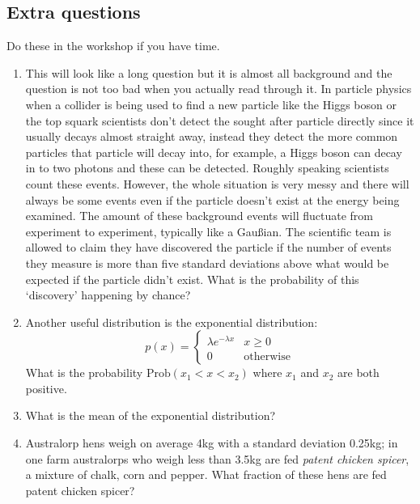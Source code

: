 \documentclass[11pt,a4paper]{scrartcl}
\begin{document}
\subsection*{Extra questions}

Do these in the workshop if you have time.

\begin{enumerate}

  
\item This will look like a long question but it is almost all
  background and the question is not too bad when you actually read
  through it. In particle physics when a collider is being used to
  find a new particle like the Higgs boson or the top squark
  scientists don't detect the sought after particle directly since it
  usually decays almost straight away, instead they detect the more
  common particles that particle will decay into, for example, a Higgs
  boson can decay in to two photons and these can be detected. Roughly
  speaking scientists count these events. However, the whole situation
  is very messy and there will always be some events even if the
  particle doesn't exist at the energy being examined. The amount of
  these background events will fluctuate from experiment to
  experiment, typically like a Gau\ss{}ian. The scientific team is
  allowed to claim they have discovered the particle if the number of
  events they measure is more than five standard deviations above
  what would be expected if the particle didn't exist. What is the
  probability of this \lq{}discovery\rq{} happening by chance?


\item Another useful distribution is the exponential distribution:
$$
p(x)=\left\{\begin{array}{cc}\lambda e^{-\lambda x}& x\ge 0\\ 0&\mbox{otherwise}\end{array}\right.
$$
What is the probability $\mbox{Prob}(x_1 < x <x_2)$ where $x_1$ and $x_2$ are both positive.

\item What is the mean of the exponential distribution?

  
\item Australorp hens weigh on average 4kg with a standard deviation
  0.25kg; in one farm australorps who weigh less than 3.5kg are fed
  \textsl{patent chicken spicer}, a mixture of chalk, corn and
  pepper. What fraction of these hens are fed patent chicken spicer?
  
\end{enumerate}
\end{document}
